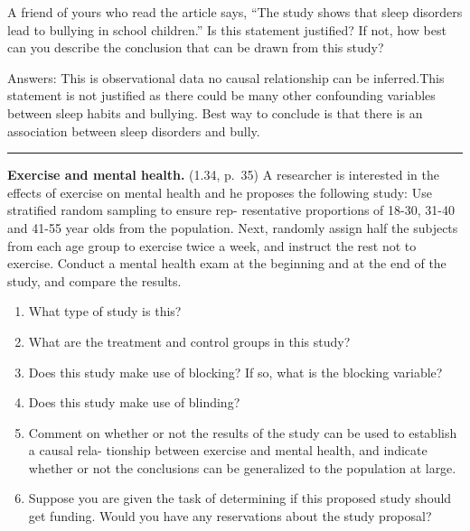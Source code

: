 \documentclass[
]{article}
\providecommand{\tightlist}{%
  \setlength{\itemsep}{0pt}\setlength{\parskip}{0pt}}
\begin{document}
A friend of yours who read the article says, ``The study shows that
sleep disorders lead to bullying in school children.'' Is this statement
justified? If not, how best can you describe the conclusion that can be
drawn from this study?

Answers: This is observational data no causal relationship can be
inferred.This statement is not justified as there could be many other
confounding variables between sleep habits and bullying. Best way to
conclude is that there is an association between sleep disorders and
bully.

\begin{center}\rule{0.5\linewidth}{0.5pt}\end{center}

\clearpage

\textbf{Exercise and mental health.} (1.34, p.~35) A researcher is
interested in the effects of exercise on mental health and he proposes
the following study: Use stratified random sampling to ensure rep-
resentative proportions of 18-30, 31-40 and 41-55 year olds from the
population. Next, randomly assign half the subjects from each age group
to exercise twice a week, and instruct the rest not to exercise. Conduct
a mental health exam at the beginning and at the end of the study, and
compare the results.

\begin{enumerate}
\def\labelenumi{(\alph{enumi})}
\tightlist
\item
  What type of study is this?
\item
  What are the treatment and control groups in this study?
\item
  Does this study make use of blocking? If so, what is the blocking
  variable?
\item
  Does this study make use of blinding?
\item
  Comment on whether or not the results of the study can be used to
  establish a causal rela- tionship between exercise and mental health,
  and indicate whether or not the conclusions can be generalized to the
  population at large.
\item
  Suppose you are given the task of determining if this proposed study
  should get funding. Would you have any reservations about the study
  proposal?
\end{enumerate}
\end{document}

